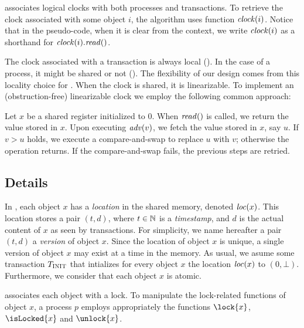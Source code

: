  associates logical clocks with both processes and transactions.
To retrieve the clock associated with some object $i$, the algorithm uses function $\clockOf{i}$.
Notice that in the pseudo-code, when it is clear from the context, we write $\clockOf{i}$ as a shorthand for $\clockOf{i}.\mathit{read}()$.

The clock associated with a transaction is always local ().
In the case of a process, it might be shared or not ().
The flexibility of our design comes from this locality choice for .
When the clock is shared, it is linearizable.
To implement an (obstruction-free) linearizable clock we employ the following common approach:
\begin{construction}
  Let $x$ be a shared register initialized to $0$.
  When $\cread$ is called, we return the value stored in $x$.
  Upon executing $\cadv(v)$, we fetch the value stored in $x$, say $u$.
  If $v > u$ holds, we execute a compare-and-swap to replace $u$ with $v$; 
  otherwise the operation returns.
  If the compare-and-swap fails, the previous steps are retried.
\end{construction}



\subsection{Details}

In , each object $x$ has a \emph{location} in the shared memory, denoted $\locationOf{x}$.
This location stores a pair $(t,d)$, where $t \in \naturalSet$ is a \emph{timestamp}, and $d$ is the actual content of $x$ as seen by transactions.
For simplicity, we name hereafter a pair $(t,d)$ a \emph{version} of object $x$.
Since the location of object $x$ is unique, a single version of object $x$ may exist at a time in the memory.
As usual, we asume some transaction $\transInit$ that intializes for every object $x$ the location $\locationOf{x}$ to $(0,\bot)$.
Furthermore, we consider that each object $x$ is atomic.

 associates each object with a lock.
To manipulate the lock-related functions of object $x$, 
a process $p$ employs appropriately the functions $\lock{x}$, $\isLocked{x}$ and $\unlock{x}$.

